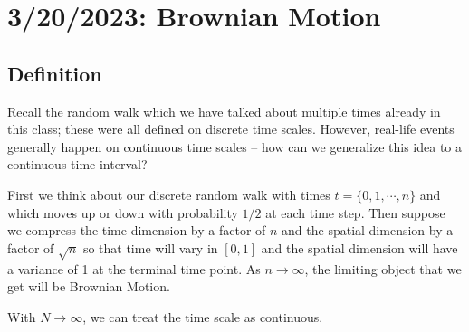 \chapter{3/20/2023: Brownian Motion}
\section{Definition}
Recall the random walk which we have talked about multiple times already in this class; these were all defined on discrete time scales. However, real-life events generally happen on continuous time scales -- how can we generalize this idea to a continuous time interval?

First we think about our discrete random walk with times $t=\{0,1,\cdots,n\}$ and which moves up or down with probability $1/2$ at each time step. Then suppose we compress the time dimension by a factor of $n$ and the spatial dimension by a factor of $\sqrt{n}$ so that time will vary in $[0,1]$ and the spatial dimension will have a variance of 1 at the terminal time point. As $n\to\infty$, the limiting object that we get will be Brownian Motion.


With $N\to\infty$, we can treat the time scale as continuous.

